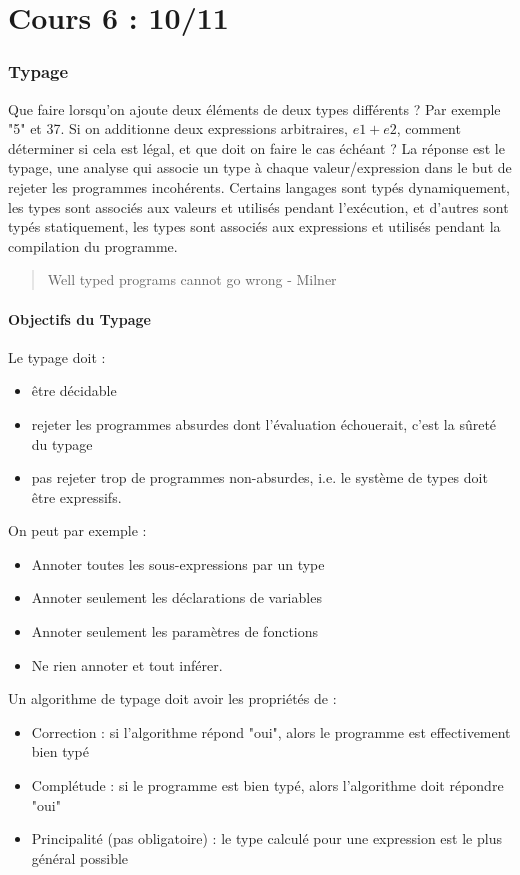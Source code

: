 \documentclass{cours}
\begin{document}
\newpage
\part[Typage]{Cours 6 : 10/11}
\localtableofcontents
\section{Typage}
Que faire lorsqu'on ajoute deux éléments de deux types différents ? Par exemple "5" et 37.
Si on additionne deux expressions arbitraires, $e1 + e2$, comment déterminer si cela est légal, et que doit on faire le cas échéant ? La réponse est le typage, une analyse qui associe un type à chaque valeur/expression dans le but de rejeter les programmes incohérents.
Certains langages sont typés dynamiquement, les types sont associés aux valeurs et utilisés pendant l'exécution, et d'autres sont typés statiquement, les types sont associés aux expressions et utilisés pendant la compilation du programme. 

\begin{quotation}
    Well typed programs cannot go wrong - Milner
\end{quotation}

\subsection{Objectifs du Typage}
Le typage doit  :
\begin{itemize}
    \item être décidable
    \item rejeter les programmes absurdes dont l'évaluation échouerait, c'est la sûreté du typage
    \item pas rejeter trop de programmes non-absurdes, i.e. le système de types doit être expressifs.
\end{itemize}

On peut par exemple : 
\begin{itemize}
    \item Annoter toutes les sous-expressions par un type
    \item Annoter seulement les déclarations de variables
    \item Annoter seulement les paramètres de fonctions
    \item Ne rien annoter et tout inférer.
\end{itemize}

Un algorithme de typage doit avoir les propriétés de :
\begin{itemize}
    \item Correction : si l'algorithme répond "oui", alors le programme est effectivement bien typé
    \item Complétude : si le programme est bien typé, alors l'algorithme doit répondre "oui"
    \item Principalité (pas obligatoire) : le type calculé pour une expression est le plus général possible
\end{itemize}
\end{document}
